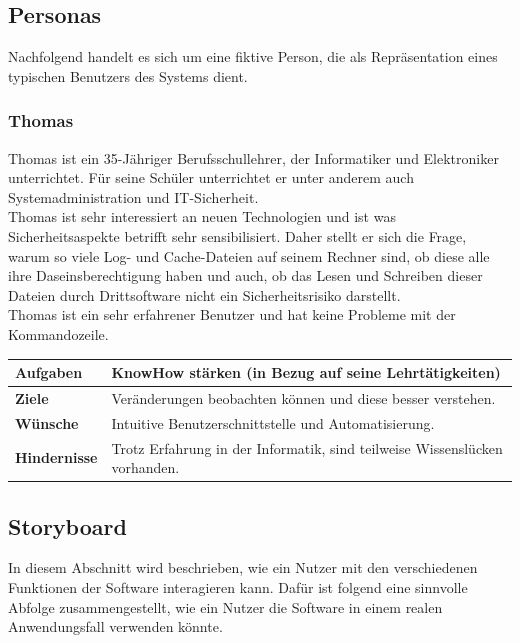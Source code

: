 \documentclass[a4paper,12pt]{report}
\begin{document}
    \subsection{Personas}\label{subsec:persona}
    Nachfolgend handelt es sich um eine fiktive Person, die als Repräsentation eines typischen Benutzers des Systems dient.

    \subsubsection{Thomas}

    Thomas ist ein 35-Jähriger Berufsschullehrer, der Informatiker und Elektroniker unterrichtet.
    Für seine Schüler unterrichtet er unter anderem auch
    Systemadministration und IT-Sicherheit. \\
    Thomas ist sehr interessiert an neuen Technologien und ist was Sicherheitsaspekte betrifft sehr sensibilisiert.
    Daher stellt er sich die Frage, warum so viele Log- und Cache-Dateien auf seinem Rechner sind, ob diese alle
    ihre Daseinsberechtigung haben und auch, ob das Lesen und Schreiben dieser Dateien durch Drittsoftware nicht ein Sicherheitsrisiko
    darstellt. \\
    Thomas ist ein sehr erfahrener Benutzer und hat keine Probleme mit der Kommandozeile.

    \begin{table}[h!]
        \centering
        \setlength{\leftmargini}{0.4cm}
        \begin{tabular}{|p{2.5cm}|p{7cm}|}
            \hline
            \textbf{Aufgaben}    & KnowHow stärken (in Bezug auf seine Lehrtätigkeiten)                      \\
            \hline
            \textbf{Ziele}       & Veränderungen beobachten können und diese besser verstehen.               \\
            \hline
            \textbf{Wünsche}     & Intuitive Benutzerschnittstelle und Automatisierung.             \\
            \hline
            \textbf{Hindernisse} & Trotz Erfahrung in der Informatik, sind teilweise Wissenslücken vorhanden. \\
            \hline
        \end{tabular}
        \label{tab:table7}
    \end{table}

    \newpage

    \subsection{Storyboard}
    In diesem Abschnitt wird beschrieben, wie ein Nutzer mit den verschiedenen Funktionen der Software
    interagieren kann.
    Dafür ist folgend eine sinnvolle Abfolge zusammengestellt, wie ein Nutzer die Software in einem realen Anwendungsfall verwenden könnte.
\end{document}
